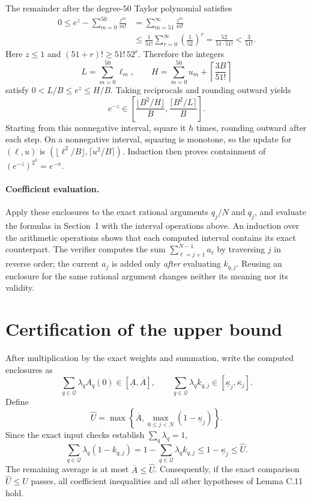 \documentclass[11pt,letterpaper]{article}
\begin{document}
\newpage
The remainder after the degree-$50$ Taylor polynomial satisfies
\begin{align*}
 0\le e^z-\sum_{m=0}^{50}\frac{z^m}{m!}
 &=\sum_{m=51}^{\infty}\frac{z^m}{m!}\\
 &\le\frac1{51!}\sum_{r=0}^{\infty}\left(\frac1{52}\right)^r
 =\frac{52}{51\cdot51!}<\frac3{51!}.
\end{align*}
Here $z\le1$ and $(51+r)!\ge51!\,52^r$. Therefore the integers
\[
 L=\sum_{m=0}^{50}\ell_m,\qquad
 H=\sum_{m=0}^{50}u_m+\left\lceil\frac{3B}{51!}\right\rceil
\]
satisfy $0<L/B\le e^z\le H/B$. Taking reciprocals and rounding outward
yields
\[
 e^{-z}\in\left[
    \frac{\lfloor B^2/H\rfloor}{B},
    \frac{\lceil B^2/L\rceil}{B}\right].
\]
Starting from this nonnegative interval, square it $h$ times, rounding
outward after each step. On a nonnegative interval, squaring is
monotone, so the update for $(\ell,u)$ is
$(\lfloor\ell^2/B\rfloor,\lceil u^2/B\rceil)$.
Induction then proves containment of $(e^{-z})^{2^h}=e^{-x}$.

\paragraph{Coefficient evaluation.}
Apply these enclosures to the exact rational arguments $q_j/N$ and
$q_j$, and evaluate the formulas in Section~1 with the interval operations
above. An induction over the arithmetic operations shows that each
computed interval contains its exact counterpart. The verifier computes
the sum $\sum_{\ell=j+1}^{N-1}a_\ell$ by traversing $j$ in reverse order;
the current $a_j$ is added only \emph{after} evaluating $k_{q,j}$.
Reusing an enclosure for the same rational argument changes neither its
meaning nor its validity.

\section{Certification of the upper bound}
After multiplication by the exact weights and summation, write the
computed enclosures as
\[
 \sum_{q\in\mathcal Q}\lambda_q A_q(0)
       \in[\underline A,\overline A],\qquad
 \sum_{q\in\mathcal Q}\lambda_q k_{q,j}
       \in[\underline\kappa_j,\overline\kappa_j].
\]
Define
\[
 \widehat U=\max\left\{\overline A,
                      \max_{0\le j<N}(1-\underline\kappa_j)\right\}.
\]
Since the exact input checks establish $\sum_q\lambda_q=1$,
\[
 \sum_{q\in\mathcal Q}\lambda_q(1-k_{q,j})
 =1-\sum_{q\in\mathcal Q}\lambda_q k_{q,j}
 \le1-\underline\kappa_j\le\widehat U.
\]
The remaining average is at most $\overline A\le\widehat U$.
Consequently, if the exact comparison $\widehat U\le U$ passes, all
coefficient inequalities and all other hypotheses of Lemma C.11 hold.
\end{document}
